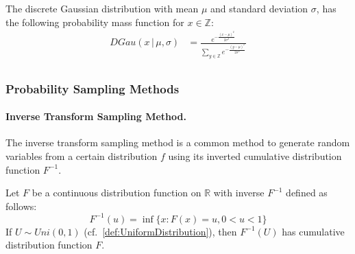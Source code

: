 \begin{definition}
    \label{def:DiscreteGaussianDistribution}
    The discrete Gaussian distribution with mean $\mu$ and standard deviation $\sigma$, has the following probability mass function for $x\in \mathbb{Z}$:
    \begin{equation}
        \begin{split}
            DGau \left(x \,|\,\mu,\sigma\right)&=\frac{e^{-\frac{\left(x-\mu\right)^2}{2 \sigma^2}} }{\sum_{y\in \mathbb{Z}} e^{-\frac{\left(y-\mu\right)^2}{2 \sigma^2}}}\\
        \end{split}
    \end{equation}
\end{definition}


\subsubsection{Probability Sampling Methods}
\label{subsec:ProbabilitySamplingMethods}

\paragraph{Inverse Transform Sampling Method.}
The inverse transform sampling method is a common method to generate random variables from a certain distribution $f$ using its inverted cumulative distribution function $F^{-1}$.
\begin{theorem}
    \label{theorem:inversionSamplingMethod}
    Let $F$ be a continuous distribution function on $\mathbb{R}$ with inverse $F^{-1}$ defined as follows:
    \begin{equation}
        F^{-1}\left( u\right) =\inf \{ x:F\left( x\right) =u,0 <u < 1\}
    \end{equation}
    If $U\sim Uni\left( 0,1\right)$ (cf.~\autoref{def:UniformDistribution}), then $F^{-1}\left( U\right)$ has cumulative distribution function $F$.
\end{theorem}


